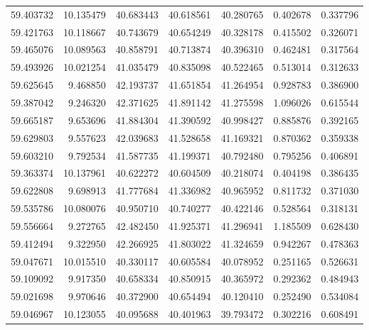 \begin{tabular}{rrrrrrr}
 59.403732 &  10.135479 &         40.683443 &         40.618561 &         40.280765 &  0.402678 &  0.337796 \\
 59.421763 &  10.118667 &         40.743679 &         40.654249 &         40.328178 &  0.415502 &  0.326071 \\
 59.465076 &  10.089563 &         40.858791 &         40.713874 &         40.396310 &  0.462481 &  0.317564 \\
 59.493926 &  10.021254 &         41.035479 &         40.835098 &         40.522465 &  0.513014 &  0.312633 \\
 59.625645 &   9.468850 &         42.193737 &         41.651854 &         41.264954 &  0.928783 &  0.386900 \\
 59.387042 &   9.246320 &         42.371625 &         41.891142 &         41.275598 &  1.096026 &  0.615544 \\
 59.665187 &   9.653696 &         41.884304 &         41.390592 &         40.998427 &  0.885876 &  0.392165 \\
 59.629803 &   9.557623 &         42.039683 &         41.528658 &         41.169321 &  0.870362 &  0.359338 \\
 59.603210 &   9.792534 &         41.587735 &         41.199371 &         40.792480 &  0.795256 &  0.406891 \\
 59.363374 &  10.137961 &         40.622272 &         40.604509 &         40.218074 &  0.404198 &  0.386435 \\
 59.622808 &   9.698913 &         41.777684 &         41.336982 &         40.965952 &  0.811732 &  0.371030 \\
 59.535786 &  10.080076 &         40.950710 &         40.740277 &         40.422146 &  0.528564 &  0.318131 \\
 59.556664 &   9.272765 &         42.482450 &         41.925371 &         41.296941 &  1.185509 &  0.628430 \\
 59.412494 &   9.322950 &         42.266925 &         41.803022 &         41.324659 &  0.942267 &  0.478363 \\
 59.047671 &  10.015510 &         40.330117 &         40.605584 &         40.078952 &  0.251165 &  0.526631 \\
 59.109092 &   9.917350 &         40.658334 &         40.850915 &         40.365972 &  0.292362 &  0.484943 \\
 59.021698 &   9.970646 &         40.372900 &         40.654494 &         40.120410 &  0.252490 &  0.534084 \\
 59.046967 &  10.123055 &         40.095688 &         40.401963 &         39.793472 &  0.302216 &  0.608491 \\

\end{tabular}
